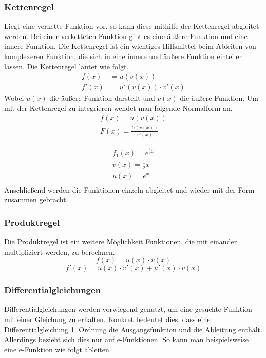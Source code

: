 \subsubsection{Kettenregel}
Liegt eine verkette Funktion vor, so kann diese mithilfe der Kettenregel abgleitet werden. Bei einer verketteten Funktion gibt es eine äußere Funktion und eine innere Funktion. 
Die Kettenregel ist ein wichtiges Hilfsmittel beim Ableiten von komplexeren Funktion, die sich in eine innere und äußere Funktion einteilen lassen. Die Kettenregel lautet wie folgt.
\begin{align*}
	f(x)&=u(v(x))\\
	f'(x)&=u'(v(x))\cdot v'(x)
\end{align*}
Wobei $u(x)$ die äußere Funktion darstellt und $v(x)$ die äußere Funktion. 
Um mit der Kettenregel zu integrieren wendet man folgende Normalform an. 
\begin{align*}
	f(x)=u(v(x))\\
	F(x)=\frac{U(v(x))}{v'(x)}
\end{align*}
\begin{beispiel}
	\begin{align*}
		f_1(x)=e^{\frac{1}{2}x}\tag{Aufteilen in innere- und äußere Funktion}\\
		v(x)=\frac{1}{2}x \tag{Die innere Funktion}\\
		u(x)=e^x\tag{Die äußere Funktion}\\
	\end{align*}
	Anschließend werden die Funktionen einzeln abgleitet und wieder mit der Form zusammen gebracht.
\end{beispiel}
\subsubsection{Produktregel}
Die Produktregel ist ein weitere Möglichkeit Funktionen, die mit einander multipliziert werden, zu berechnen.
\[f(x)=u(x)\cdot v(x)\]
\[f'(x)=u(x)\cdot v'(x)+u'(x)\cdot v(x)\]
\subsubsection{Differentialgleichungen}
Differentialgleichungen werden vorwiegend genutzt, um eine gesuchte Funktion mit einer Gleichung zu erhalten. Konkret bedeutet dies, dass eine Differentialgleichung 1. Ordnung
die Ausgangsfunktion und die Ableitung enthält. Allerdings bezieht sich dies nur auf e-Funktionen. So kann man beispielsweise eine e-Funktion wie folgt ableiten. 

